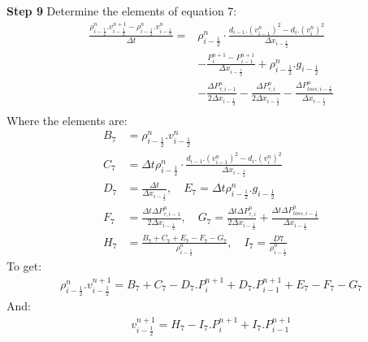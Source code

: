 \documentclass[11pt,letterpaper,titlepage]{article}
\newcommand{\half}{\frac{1}{2}}
\begin{document}
\newpage \noindent
\textbf{Step 9}\newline
Determine the elements of equation 7:
\begin{equation*}
\begin{aligned}
\frac{\rho_{i-\half}^{n}.v_{i-\half}^{n+1}-\rho_{i-\half}^n.v_{i-\half}^n}{\Delta t} =& \rho_{i-\half}^n\cdot\frac{d_{i-1}.(v_{i-1}^n)^2-d_{i}.(v_{i}^n)^2}{\Delta x_{i-\half}}     \\
&-\frac{P_{i}^{n+1}-P_{i-1}^{n+1}}{\Delta x_{i-\half}} +\rho_{i-\half}^n.g_{i-\half} \\
&-\frac{\Delta P_{\tau,i-1}^n }{2\Delta x_{i-\half}}- \frac{\Delta P_{\tau,i}^n }{2\Delta x_{i-\half}} -\frac{\Delta P_{loss,i-\half}^n}{\Delta x_{i-\half}} \\
\end{aligned}
\end{equation*}
\newline
Where the elements are:
\begin{equation*}
\begin{aligned}
B_7&=\rho_{i-\half}^n.v_{i-\half}^n\\
C_7&=\Delta t\rho_{i-\half}^n\cdot\frac{d_{i-1}.(v_{i-1}^n)^2-d_{i}.(v_{i}^n)^2}{\Delta x_{i-\half}}\\
D_7&=\frac{\Delta t}{\Delta x_{i-\half}}, \quad E_7=\Delta t \rho_{i-\half}^n.g_{i-\half} \\
F_7&=\frac{\Delta t \Delta P_{\tau,i-1}^n }{2\Delta x_{i-\half}}, \quad G_7=\frac{\Delta t \Delta P_{\tau,i}^n }{2\Delta x_{i-\half}} +\frac{\Delta t \Delta P_{loss,i-\half}^n}{\Delta x_{i-\half}} \\
H_7&=\frac{B_7+C_7+E_7-F_7-G_7}{\rho_{i-\half}^{n}}, \quad I_7=\frac{D7}{\rho_{i-\half}^{n}}
\end{aligned}
\end{equation*}
\newline
To get:
\begin{equation*}
\begin{aligned}
\rho_{i-\half}^{n}.v_{i-\half}^{n+1}=B_7+C_7-D_7.P_{i}^{n+1}+D_7.P_{i-1}^{n+1}+E_7-F_7-G_7
\end{aligned}
\end{equation*}
And:
\begin{equation}
\begin{aligned}
v_{i-\half}^{n+1}=H_7-I_7.P_{i}^{n+1}+I_7.P_{i-1}^{n+1}
\end{aligned}
\end{equation}
\end{document}
